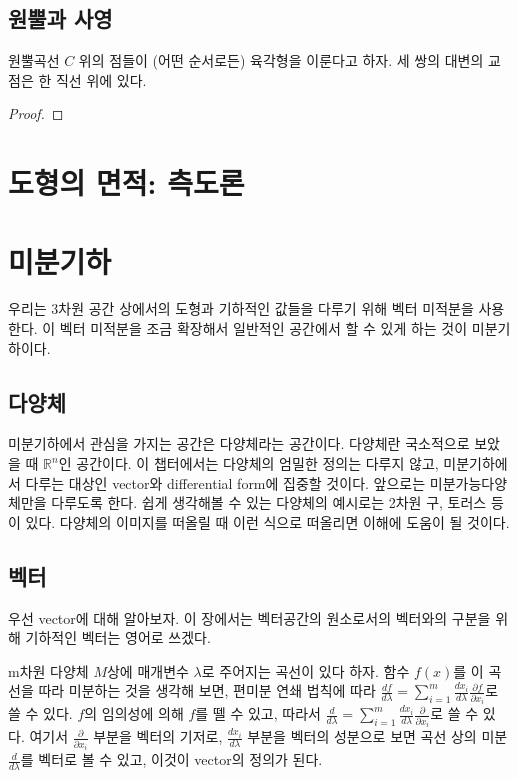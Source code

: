 \section{원뿔과 사영}

\begin{theorem}[Pascal]\label{thm:pascal}
    원뿔곡선 $C$ 위의 점들이 (어떤 순서로든) 육각형을 이룬다고 하자. 세 쌍의 대변의 교점은 한 직선 위에 있다. 
\end{theorem}
\begin{proof}
    
\end{proof}
\chapter{도형의 면적: 측도론}

\chapter{미분기하}
우리는 3차원 공간 상에서의 도형과 기하적인 값들을 다루기 위해 벡터 미적분을 사용한다. 이 벡터 미적분을 조금 확장해서 일반적인 공간에서 할 수 있게 하는 것이 미분기하이다.
\section{다양체}
미분기하에서 관심을 가지는 공간은 다양체라는 공간이다. 다양체란 국소적으로 보았을 때 $\mathbb{R}^n$인 공간이다. 이 챕터에서는 다양체의 엄밀한 정의는 다루지 않고, 미분기하에서 다루는 대상인 vector와 differential form에 집중할 것이다. 앞으로는 미분가능다양체만을 다루도록 한다.
쉽게 생각해볼 수 있는 다양체의 예시로는 2차원 구, 토러스 등이 있다. 다양체의 이미지를 떠올릴 때 이런 식으로 떠올리면 이해에 도움이 될 것이다.

\section{벡터}
우선 vector에 대해 알아보자. 이 장에서는 벡터공간의 원소로서의 벡터와의 구분을 위해 기하적인 벡터는 영어로 쓰겠다.

m차원 다양체 $M$상에 매개변수 $\lambda$로 주어지는 곡선이 있다 하자. 함수 $f(x)$를 이 곡선을 따라 미분하는 것을 생각해 보면, 편미분 연쇄 법칙에 따라 $\frac{df}{d\lambda}=\sum_{i=1}^m \frac{dx_i}{d\lambda}\frac{\partial f}{\partial x_i}$로 쓸 수 있다. $f$의 임의성에 의해 $f$를 뗄 수 있고, 따라서 $\frac{d}{d\lambda}=\sum_{i=1}^m \frac{dx_i}{d\lambda}\frac{\partial}{\partial x_i}$로 쓸 수 있다.
여기서 $\frac{\partial}{\partial x_i}$ 부분을 벡터의 기저로, $\frac{dx_i}{d\lambda}$ 부분을 벡터의 성분으로 보면 곡선 상의 미분 $\frac{d}{d\lambda}$를 벡터로 볼 수 있고, 이것이 vector의 정의가 된다.

